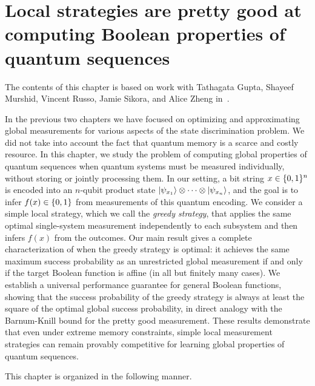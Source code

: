 \chapter{Local strategies are pretty good at computing Boolean properties of quantum sequences} \label{ch:qseq}

The contents of this chapter is based on work with Tathagata Gupta, Shayeef Murshid, Vincent Russo, Jamie Sikora, and Alice Zheng in~\cite{gupta2026localstrategiesprettygood}.

In the previous two chapters we have focused on optimizing and approximating global measurements for various aspects of the state discrimination problem.
We did not take into account the fact that quantum memory is a scarce and costly resource.
In this chapter, we study the problem of computing global properties of quantum sequences when quantum systems must be measured individually, without storing or jointly processing them.
In our setting, a bit string $x \in \{ 0, 1 \}^n$ is encoded into an $n$-qubit product state $\ket{\psi_{x_1}} \otimes \cdots \otimes \ket{\psi_{x_n}}$, and the goal is to infer $f(x) \in \{ 0, 1 \}$ from measurements of this quantum encoding.
We consider a simple local strategy, which we call the \emph{greedy strategy}, that applies the same optimal single-system measurement independently to each subsystem and then infers $f(x)$ from the outcomes.
Our main result gives a complete characterization of when the greedy strategy is optimal: it achieves the same maximum success probability as an unrestricted global measurement if and only if the target Boolean function is affine (in all but finitely many cases).
We establish a universal performance guarantee for general Boolean functions, showing that the success probability of the greedy strategy is always at least the square of the optimal global success probability, in direct analogy with the Barnum-Knill bound for the pretty good measurement.
These results demonstrate that even under extreme memory constraints, simple local measurement strategies can remain provably competitive for learning global properties of quantum sequences.

This chapter is organized in the following manner.

